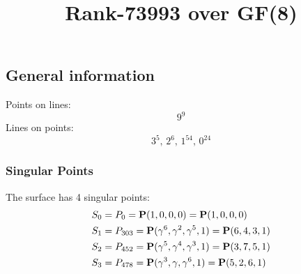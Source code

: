 \documentclass{article}
\newcommand\setTBstruts{\def\T{\rule{0pt}{2.6ex}}%
\def\B{\rule[-1.2ex]{0pt}{0pt}}}
\newcommand{\bP}{{\bf P}}
\begin{document}
 
\setTBstruts



{\allowdisplaybreaks%






\title{Rank-73993 over GF(8)}
\author{}%
\maketitle%
%
{}



\subsection*{General information}
Points on lines:
$$
9^9$$
Lines on points:
$$
3^5,\,2^6,\,1^{54},\,0^{24}$$
\subsubsection*{Singular Points}
The surface has 4 singular points:\\
\begin{align*}
S_{0} &= P_{0}=\bP(1, 0, 0, 0) = \bP(1, 0, 0, 0)\\
S_{1} &= P_{303}=\bP(\gamma^{6}, \gamma^{2}, \gamma^{5}, 1) = \bP(6, 4, 3, 1)\\
S_{2} &= P_{452}=\bP(\gamma^{5}, \gamma^{4}, \gamma^{3}, 1) = \bP(3, 7, 5, 1)\\
S_{3} &= P_{478}=\bP(\gamma^{3}, \gamma , \gamma^{6}, 1) = \bP(5, 2, 6, 1)\\
\end{align*}
}
\end{document}

